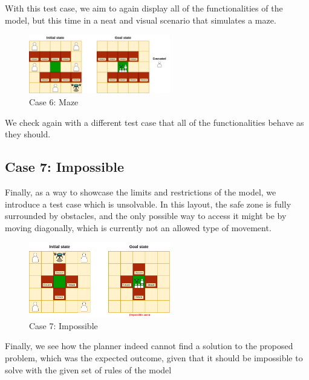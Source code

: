 \documentclass{article}
\begin{document}
With this test case, we aim to again display all of the functionalities of the model, but this time in a neat and visual scenario that simulates a maze.

\begin{figure}[ht]
    \centering
    \includegraphics[width=0.55\textwidth]{assets/problem-6-maze.drawio.png} %
    \caption{Case 6: Maze}
    \label{fig:initial-state-maze}
\end{figure}
\FloatBarrier

We check again with a different test case that all of the functionalities behave as they should.

\subsection{Case 7: Impossible}

Finally, as a way to showcase the limits and restrictions of the model, we introduce a test case which is unsolvable. In this layout, the safe zone is fully surrounded by obstacles, and the only possible way to access it might be by moving diagonally, which is currently not an allowed type of movement.

\begin{figure}[H]
    \centering
    \includegraphics[width=0.55\textwidth]{assets/problem-7-impossible.drawio.png} %
    \caption{Case 7: Impossible}
    \label{fig:initial-state-impossible}
\end{figure}
\FloatBarrier

Finally, we see how the planner indeed cannot find a solution to the proposed problem, which was the expected outcome, given that it should be impossible to solve with the given set of rules of the model
\end{document}
